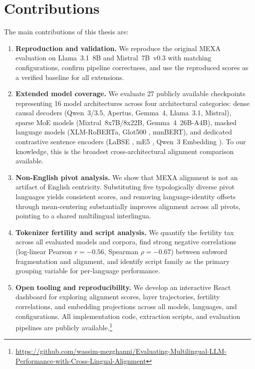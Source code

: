 \section{Contributions}
\label{sec:intro-contributions}

The main contributions of this thesis are:

\begin{enumerate}
    \item \textbf{Reproduction and validation.} We reproduce the original MEXA evaluation on Llama~3.1~8B and Mistral~7B~v0.3 with matching configurations, confirm pipeline correctness, and use the reproduced scores as a verified baseline for all extensions.

    \item \textbf{Extended model coverage.} We evaluate 27 publicly available checkpoints representing 16 model architectures across four architectural categories: dense causal decoders (Qwen~3/3.5, Apertus, Gemma~4, Llama~3.1, Mistral), sparse MoE models (Mixtral~8x7B/8x22B, Gemma~4~26B-A4B), masked language models (XLM-RoBERTa, Glot500 \citep{imani2023glot500}, mmBERT), and dedicated contrastive sentence encoders (LaBSE \citep{feng2022labse}, mE5 \citep{wang2024multilingual}, Qwen~3 Embedding \citep{zhang2025qwen3embeddingadvancingtext}). To our knowledge, this is the broadest cross-architectural alignment comparison available.

    \item \textbf{Non-English pivot analysis.} We show that MEXA alignment is not an artifact of English centricity. Substituting five typologically diverse pivot languages yields consistent scores, and removing language-identity offsets through mean-centering substantially improves alignment across all pivots, pointing to a shared multilingual interlingua.

    \item \textbf{Tokenizer fertility and script analysis.} We quantify the fertility tax across all evaluated models and corpora, find strong negative correlations (log-linear Pearson $r = -0.56$, Spearman $\rho = -0.67$) between subword fragmentation and alignment, and identify script family as the primary grouping variable for per-language performance.

    \item \textbf{Open tooling and reproducibility.} We develop an interactive React dashboard for exploring alignment scores, layer trajectories, fertility correlations, and embedding projections across all models, languages, and configurations. All implementation code, extraction scripts, and evaluation pipelines are publicly available.\footnote{\url{https://github.com/wassim-mezghanni/Evaluating-Multilingual-LLM-Performance-with-Cross-Lingual-Alignment}}
\end{enumerate}


